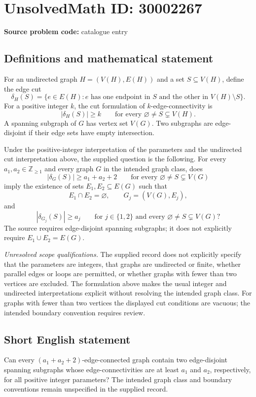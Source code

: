 \documentclass[11pt]{article}
\newcommand{\Z}{\mathbb{Z}}
\begin{document}
\section*{UnsolvedMath ID: 30002267}
\textbf{Source problem code:} catalogue entry
\subsection{Definitions and mathematical statement}
For an undirected graph \(H=(V(H),E(H))\) and a set \(S\subseteq V(H)\), define the edge cut
\[
\delta_H(S)=\{e\in E(H):e\text{ has one endpoint in }S\text{ and the other in }V(H)\setminus S\}.
\]
For a positive integer \(k\), the cut formulation of \(k\)-edge-connectivity is
\[
|\delta_H(S)|\geq k\qquad\text{for every }\varnothing\neq S\subsetneq V(H).
\]
A spanning subgraph of \(G\) has vertex set \(V(G)\). Two subgraphs are edge-disjoint if their edge sets have empty intersection.

Under the positive-integer interpretation of the parameters and the undirected cut interpretation above, the supplied question is the following. For every \(a_1,a_2\in\Z_{\geq1}\) and every graph \(G\) in the intended graph class, does
\[
|\delta_G(S)|\geq a_1+a_2+2
\qquad\text{for every }\varnothing\neq S\subsetneq V(G)
\]
imply the existence of sets \(E_1,E_2\subseteq E(G)\) such that
\[
E_1\cap E_2=\varnothing,
\qquad G_j=(V(G),E_j),
\]
and
\[
|\delta_{G_j}(S)|\geq a_j
\qquad\text{for }j\in\{1,2\}\text{ and every }\varnothing\neq S\subsetneq V(G)?
\]
The source requires edge-disjoint spanning subgraphs; it does not explicitly require \(E_1\cup E_2=E(G)\).

\textit{Unresolved scope qualifications.} The supplied record does not explicitly specify that the parameters are integers, that graphs are undirected or finite, whether parallel edges or loops are permitted, or whether graphs with fewer than two vertices are excluded. The formulation above makes the usual integer and undirected interpretations explicit without resolving the intended graph class. For graphs with fewer than two vertices the displayed cut conditions are vacuous; the intended boundary convention requires review.
\subsection{Short English statement}
Can every \((a_1+a_2+2)\)-edge-connected graph contain two edge-disjoint spanning subgraphs whose edge-connectivities are at least \(a_1\) and \(a_2\), respectively, for all positive integer parameters? The intended graph class and boundary conventions remain unspecified in the supplied record.
\end{document}
